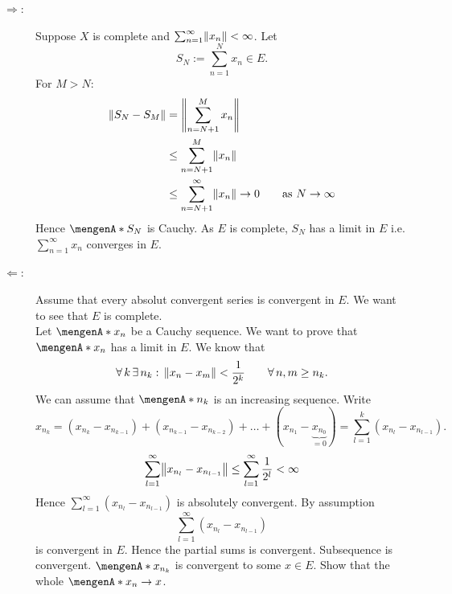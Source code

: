 \begin{beweis}
	\begin{description}
		\item[$\Rightarrow$:] Suppose $X$ is complete and $\sum_{n=1}^{\infty}\norm{x_n} < \infty$. Let 
		\[
			S_N := \sum_{n=1}^{N}x_n \in E.
		\] 
		For $M >N$:
		\begin{align*}
			\norm{S_N-S_M} &= \norm{\sum_{n=N+1}^{M}x_n} \\
			&\leq \sum_{n=N+1}^{M} \norm{x_n} \\
			&\leq \sum_{n=N+1}^{\infty} \norm{x_n} \to 0 \qquad \text{as }N \to \infty
		\end{align*}
		Hence $\set{S_N}$ is Cauchy. As $E$ is complete, $S_N$ has a limit in $E$ i.e. $\sum_{n=1}^{\infty}x_n$ converges in $E$.
		\item[$\Leftarrow$:] Assume that every absolut convergent series is convergent in $E$. We want to see that $E$ is complete. \\
		Let $\set{x_n}$ be a Cauchy sequence. We want to prove that $\set{x_n}$ has a limit in $E$. We know that
		\[
			\forall\, k \,\exists\,n_k: \, \norm{x_n-x_m}< \frac{1}{2^k} \qquad \forall\, n,m \geq n_k.
		\]
		We can assume that $\set{n_k}$ is an increasing sequence. Write
		\[
			x_{n_k} = (x_{n_k}-x_{n_{k-1}})+ (x_{n_{k-1}}-x_{n_{k-2}}) + \dots +(x_{n_1}-\underset{=0}{\underbrace{x_{n_0}}}) = \sum_{l=1}^{k}(x_{n_l}-x_{n_{l-1}}).
		\]
		\[
			\sum_{l=1}^{\infty}\norm{x_{n_l}-x_{n_{l-1}}} \leq \sum_{l=1}^{\infty}\frac{1}{2^l} < \infty
		\]
		Hence $\sum_{l=1}^{\infty}(x_{n_l}-x_{n_{l-1}})$ is absolutely convergent. By assumption 
		\[
			\sum_{l=1}^{\infty}(x_{n_l}-x_{n_{l-1}}) 
		\]
		is convergent in $E$. Hence the partial sums is convergent. Subsequence is convergent. $\set{x_{n_k}}$ is convergent to some $x \in E$.
		 Show that the whole $\set{x_n} \to x$.
	\end{description}
\end{beweis}